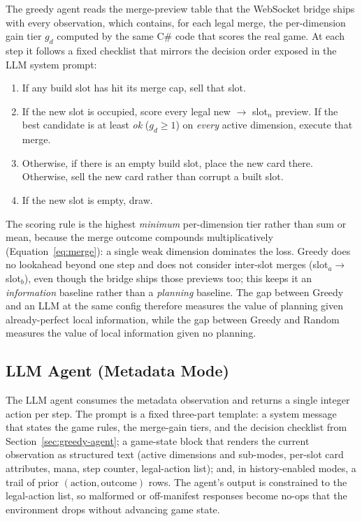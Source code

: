 \documentclass[11pt]{article}
\begin{document}
The greedy agent reads the merge-preview table that the WebSocket bridge
ships with every observation, which contains, for each legal merge, the
per-dimension gain tier $g_d$ computed by the same C\# code that scores
the real game. At each step it follows a fixed checklist that mirrors the
decision order exposed in the LLM system prompt:
\begin{enumerate}
  \item If any build slot has hit its merge cap, sell that slot.
  \item If the new slot is occupied, score every legal
    new $\to$ slot$_n$ preview. If the best candidate is at least
    \emph{ok} ($g_d \geq 1$) on \emph{every} active dimension, execute
    that merge.
  \item Otherwise, if there is an empty build slot, place the new card
    there. Otherwise, sell the new card rather than corrupt a built slot.
  \item If the new slot is empty, draw.
\end{enumerate}
The scoring rule is the highest \emph{minimum} per-dimension tier rather
than sum or mean, because the merge outcome compounds multiplicatively
(Equation~\ref{eq:merge}): a single weak dimension dominates the loss.
Greedy does no lookahead beyond one step and does not consider inter-slot
merges (slot$_a \to$ slot$_b$), even though the bridge ships those previews
too; this keeps it an \emph{information} baseline rather than a
\emph{planning} baseline. The gap between Greedy and an LLM at the same
config therefore measures the value of planning given already-perfect
local information, while the gap between Greedy and Random measures the
value of local information given no planning.

\subsection{LLM Agent (Metadata Mode)}
\label{sec:llm-agent}

The LLM agent consumes the metadata observation and returns a single
integer action per step. The prompt is a fixed three-part template: a
system message that states the game rules, the merge-gain tiers, and the
decision checklist from Section~\ref{sec:greedy-agent}; a game-state block
that renders the current observation as structured text (active
dimensions and sub-modes, per-slot card attributes, mana, step counter,
legal-action list); and, in history-enabled modes, a trail of prior
$(\text{action}, \text{outcome})$ rows. The agent's output is constrained
to the legal-action list, so malformed or off-manifest responses become
no-ops that the environment drops without advancing game state.
\end{document}

